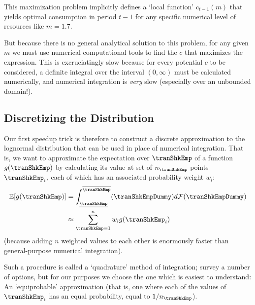 \documentclass[titlepage, headings=optiontotocandhead]{econtex}
\begin{document}
\lstset{basicstyle=\ttfamily\footnotesize,breaklines=true,language=Python,frame=single}


This maximization problem implicitly defines a `local function' $\mathrm{c}_{t-1}(m)$ that yields optimal consumption in period $t-1$ for any specific numerical level of resources like $m=1.7$.%

But because there is no general analytical solution to this problem, for any given $m$ we must use numerical computational tools to find the $c$ that maximizes the expression.  This is excruciatingly slow because for every potential $c$ to be considered, a definite integral over the interval $(0,\infty)$ must be calculated numerically, and numerical integration is \textit{very} slow (especially over an unbounded domain!).

\hypertarget{discretizing-the-distribution}{}
\subsection{Discretizing the Distribution}
Our first speedup trick is therefore to construct a discrete approximation to the lognormal distribution that can be used in place of numerical integration.  That is, we want to approximate the expectation over $\tranShkEmp$ of a function $g(\tranShkEmp)$ by calculating its value at set of $n_{\tranShkEmp}$ points $\tranShkEmp_{i}$, each of which has an associated probability weight $w_{i}$:
\begin{equation*}\begin{gathered}\begin{aligned}
      {\mathbb{E}}[g(\tranShkEmp)] & = \int_{\underline{\tranShkEmp}}^{\overline{\tranShkEmp}}(\tranShkEmpDummy)d\mathcal{F}(\tranShkEmpDummy) \\
      & \approx \sum_{\tranShkEmp = 1}^{n}w_{i}g(\tranShkEmp_{i})
    \end{aligned}\end{gathered}\end{equation*}
(because adding $n$ weighted values to each other is enormously faster than general-purpose numerical integration).

Such a procedure is called a `quadrature' method of integration; \cite{Tanaka2013-bc} survey a number of options, but for our purposes we choose the one which is easiest to understand: An `equiprobable' approximation (that is, one where each of the values of $\tranShkEmp_{i}$ has an equal probability, equal to $1/n_{\tranShkEmp}$).
\end{document}
